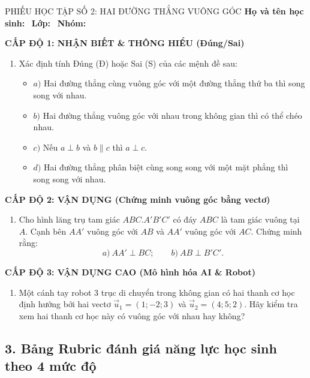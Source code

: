 \documentclass[12pt, a4paper]{article}
\renewcommand{\vec}[1]{\overrightarrow{#1}}
\begin{document}
\begin{pedabox}{PHIẾU HỌC TẬP SỐ 2: HAI ĐƯỜNG THẲNG VUÔNG GÓC}
\textbf{Họ và tên học sinh:} \dotfill \ \textbf{Lớp:} \dotfill \ \textbf{Nhóm:} \dotfill

\noindent \textbf{CẤP ĐỘ 1: NHẬN BIẾT \& THÔNG HIỂU (Đúng/Sai)}
\begin{enumerate}[leftmargin=0.6cm]
    \item Xác định tính Đúng (Đ) hoặc Sai (S) của các mệnh đề sau:
    \begin{itemize}
        \item [$\Box$] $a)$ Hai đường thẳng cùng vuông góc với một đường thẳng thứ ba thì song song với nhau.
        \item [$\Box$] $b)$ Hai đường thẳng vuông góc với nhau trong không gian thì có thể chéo nhau.
        \item [$\Box$] $c)$ Nếu $a \perp b$ và $b \parallel c$ thì $a \perp c$.
        \item [$\Box$] $d)$ Hai đường thẳng phân biệt cùng song song với một mặt phẳng thì song song với nhau.
    \end{itemize}
\end{enumerate}

\noindent \textbf{CẤP ĐỘ 2: VẬN DỤNG (Chứng minh vuông góc bằng vectơ)}
\begin{enumerate}[leftmargin=0.6cm]
    \item Cho hình lăng trụ tam giác $ABC.A'B'C'$ có đáy $ABC$ là tam giác vuông tại $A$. Cạnh bên $AA'$ vuông góc với $AB$ và $AA'$ vuông góc với $AC$. Chứng minh rằng:
    $$a) \ AA' \perp BC; \qquad b) \ AB \perp B'C'.$$
\end{enumerate}

\noindent \textbf{CẤP ĐỘ 3: VẬN DỤNG CAO (Mô hình hóa AI \& Robot)}
\begin{enumerate}[leftmargin=0.6cm]
    \item Một cánh tay robot 3 trục di chuyển trong không gian có hai thanh cơ học định hướng bởi hai vectơ $\vec{u}_1 = (1; -2; 3)$ và $\vec{u}_2 = (4; 5; 2)$. Hãy kiểm tra xem hai thanh cơ học này có vuông góc với nhau hay không?
\end{enumerate}
\end{pedabox}

\subsection*{3. Bảng Rubric đánh giá năng lực học sinh theo 4 mức độ}
\end{document}
